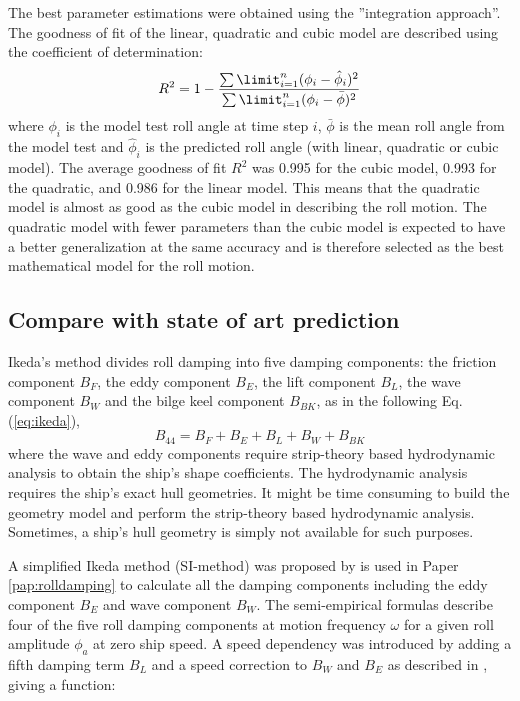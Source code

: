 \noindent The best parameter estimations were obtained using the ''integration approach''.
The goodness of fit of the linear, quadratic and cubic model are described using the coefficient of determination:
\begin{equation} \label{eq:R2}
R^2=1-\frac{\sum\limit_{i=1}^{n}(\phi_{i}-\hat{\phi}_i)^2}{\sum\limit_{i=1}^{n}(\phi_i-\bar \phi)^2}
\end{equation}
where $\phi_i$ is the model test roll angle at time step $i$, $\bar \phi$ is the mean roll angle from the model test and $\hat{\phi}_i$ is the predicted roll angle (with linear, quadratic or cubic model). The average goodness of fit $R^2$ was 0.995 for the cubic model, 0.993 for the quadratic, and 0.986 for the linear model. This means that the quadratic model is almost as good as the cubic model in describing the roll motion. The quadratic model with fewer parameters than the cubic model is expected to have a better generalization at the same accuracy and is therefore selected as the best mathematical model for the roll motion. 

\subsection{Compare with state of art prediction}
Ikeda's method divides roll damping into five damping components: the friction component $B_F$, the eddy component $B_E$, the lift component $B_L$, the wave component $B_W$ and the bilge keel component $B_{BK}$, as in the following Eq.(\ref{eq:ikeda}), 
\begin{equation} \label{eq:ikeda}
B_{44} = B_F + B_E + B_L + B_W + B_{BK}
\end{equation}
where the wave and eddy components require strip-theory based hydrodynamic analysis to obtain the ship's shape coefficients. The hydrodynamic analysis requires the ship's exact hull geometries. It might be time consuming to build the geometry model and perform the strip-theory based hydrodynamic analysis. Sometimes, a ship's hull geometry is simply not available for such purposes. 

A simplified Ikeda method (SI-method) was proposed by \parencite{kawahara_simple_2011} is used in Paper \ref{pap:rolldamping} to calculate all the damping components including the eddy component $B_E$ and wave component $B_W$. The semi-empirical formulas describe four of the five roll damping components at motion frequency $\omega$ for a given roll amplitude $\phi_a$ at zero ship speed. A speed dependency was introduced by adding a fifth damping term $B_L$ and a speed correction to $B_W$ and $B_E$ as described in \parencite{ikeda_velocity_1979}, giving a function: 


